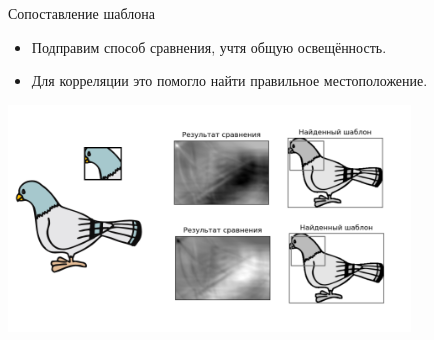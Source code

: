 \begin{frame}{Сопоставление шаблона}

\begin{itemize}
    \item Подправим способ сравнения, учтя общую освещённость.
    \item Для корреляции это помогло найти правильное местоположение.
\end{itemize}

\centering
\includegraphics[width=0.8\textwidth]{images/pigeon template matching2.png}

\end{frame}
